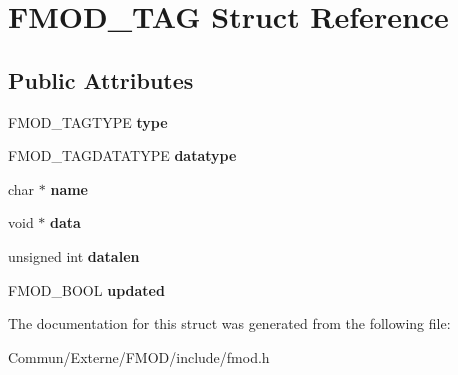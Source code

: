 \hypertarget{struct_f_m_o_d___t_a_g}{}\section{F\+M\+O\+D\+\_\+\+T\+AG Struct Reference}
\label{struct_f_m_o_d___t_a_g}
\subsection*{Public Attributes}
\begin{DoxyCompactItemize}
\item 
F\+M\+O\+D\+\_\+\+T\+A\+G\+T\+Y\+PE {\bfseries type}\hypertarget{struct_f_m_o_d___t_a_g_ad891c5f78e72ffeebc0f39e34e5b1b20}{}\label{struct_f_m_o_d___t_a_g_ad891c5f78e72ffeebc0f39e34e5b1b20}

\item 
F\+M\+O\+D\+\_\+\+T\+A\+G\+D\+A\+T\+A\+T\+Y\+PE {\bfseries datatype}\hypertarget{struct_f_m_o_d___t_a_g_acc0f4bf92ee045d5828ba7eccc3c4c23}{}\label{struct_f_m_o_d___t_a_g_acc0f4bf92ee045d5828ba7eccc3c4c23}

\item 
char $\ast$ {\bfseries name}\hypertarget{struct_f_m_o_d___t_a_g_a200d18627ec871638bb7df841a77b2ab}{}\label{struct_f_m_o_d___t_a_g_a200d18627ec871638bb7df841a77b2ab}

\item 
void $\ast$ {\bfseries data}\hypertarget{struct_f_m_o_d___t_a_g_a86247271797eb33118a5fff813c1e548}{}\label{struct_f_m_o_d___t_a_g_a86247271797eb33118a5fff813c1e548}

\item 
unsigned int {\bfseries datalen}\hypertarget{struct_f_m_o_d___t_a_g_a589281f4f1adc717798744722ec43761}{}\label{struct_f_m_o_d___t_a_g_a589281f4f1adc717798744722ec43761}

\item 
F\+M\+O\+D\+\_\+\+B\+O\+OL {\bfseries updated}\hypertarget{struct_f_m_o_d___t_a_g_a0358f4afc9957d3d3254691c3118d90a}{}\label{struct_f_m_o_d___t_a_g_a0358f4afc9957d3d3254691c3118d90a}

\end{DoxyCompactItemize}


The documentation for this struct was generated from the following file\+:\begin{DoxyCompactItemize}
\item 
Commun/\+Externe/\+F\+M\+O\+D/include/fmod.\+h\end{DoxyCompactItemize}
